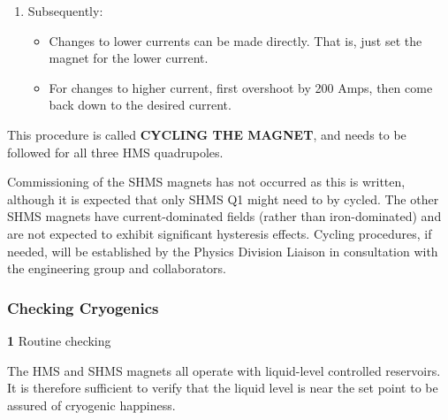 {\begin{enumerate}
{     This means: to change the polarity and set the current go to 950 Amps,
     down to zero, back up to 950 Amps, and down to the desired setting.}
  \item{Subsequently:
  \begin{itemize}
     \item{Changes to lower currents can be made directly.
        That is, just set the magnet for the lower current.}
     \item{For changes to higher current, first overshoot
        by 200 Amps, then come back down to the desired current.}
  \end{itemize}}
\end{enumerate}
This procedure is called \textbf{CYCLING THE MAGNET}, and needs to be  followed for all three HMS quadrupoles.

Commissioning of the SHMS magnets has not occurred as this is written, although it
is expected that only SHMS Q1 might need to by cycled. The other SHMS magnets have
current-dominated fields (rather than iron-dominated) and are not expected to
exhibit significant hysteresis effects. Cycling procedures, if needed, will be established by
the Physics Division Liaison in consultation with the engineering group and collaborators.

\subsubsection{Checking Cryogenics}

\begin{description}
\item{\bf 1}\hskip0.1in Routine checking
\item{}\hskip0.3in The HMS and SHMS magnets all operate with liquid-level controlled
reservoirs. It is therefore sufficient to verify that the liquid level
is near the set point to be assured of cryogenic happiness.
\end{description}

}
